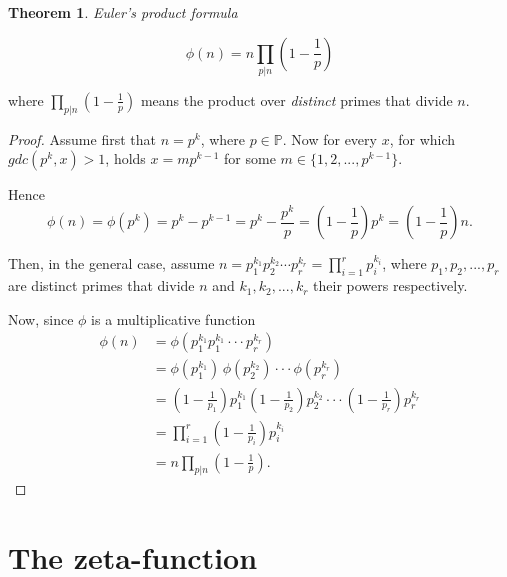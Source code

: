 \documentclass{article}
\theoremstyle{definition}
\newtheorem{theorem}[subsection]{Theorem}
\begin{document}
\begin{theorem}{\emph{Euler's product formula}}

\begin{equation*}
    \phi(n) = n \prod_{p \vert n} \left(1 - \frac{1}{p}\right)
\end{equation*}

where $\prod_{p \vert n} (1 - \frac{1}{p})$ means the product over \emph{distinct} primes that divide $n$.

\begin{proof}

Assume first that $n = p^k$, where $p\in \mathbb{P}$. Now for every $x$, for which $gdc(p^k,x)>1$, holds $x=mp^{k-1}$ for some $m\in \{1,2,...,p^{k-1}\}$.


Hence
\begin{equation*}
    \phi(n)=\phi(p^k)=p^k-p^{k-1}=p^k-\frac{p^k}{p}=\left(1-\frac{1}{p}\right)p^k=\left(1-\frac{1}{p}\right)n.
\end{equation*}

Then, in the general case, assume $n=p_1^{k_1} p_2^{k_2} \cdots p_r^{k_r}=\prod_{i=1}^r p_i^{k_i}$, where $p_1,p_2,...,p_r$ are distinct primes that divide $n$ and $k_1,k_2,...,k_r$ their powers respectively. 


Now, since $\phi$ is a multiplicative function
\begin{align*}
    \phi(n) & = \phi(p_1^{k_1} p_1^{k_1} \cdot \cdot \cdot p_r^{k_r})\\
    & = \phi(p_1^{k_1})\,\phi(p_2^{k_2}) \cdot \cdot \cdot \phi(p_r^{k_r})\\
    & = \left(1-\frac{1}{p_1}\right)p_1^{k_1} \left(1-\frac{1}{p_2}\right)p_2^{k_2} \cdot \cdot \cdot \left(1-\frac{1}{p_r}\right)p_r^{k_r}\\
    & = \prod_{i=1}^r \left(1-\frac{1}{p_i}\right) p_i^{k_i}\\
    & = n \prod_{p \vert n} \left(1 - \frac{1}{p}\right).
\end{align*}

\end{proof}

\end{theorem}

\section{The zeta-function}
\end{document}
